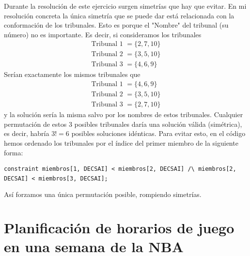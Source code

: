 \documentclass[11pt]{article}
\begin{document}
Durante la resolución de este ejercicio surgen simetrías que hay que evitar. En mi resolución concreta la única simetría que se puede dar está relacionada con la conformación de los tribunales. Esto es porque el "Nombre" del tribunal (su número) no es importante. Es decir, si consideramos los tribunales
\begin{gather*}
    \text{Tribunal 1 }=\{2, 7, 10\}\\
    \text{Tribunal 2 }=\{3, 5, 10\}\\
    \text{Tribunal 3 }=\{4, 6, 9\}
\end{gather*}
Serían exactamente los mismos tribunales que
\begin{gather*}
    \text{Tribunal 1 }=\{4, 6, 9\}\\
    \text{Tribunal 2 }=\{3, 5, 10\}\\
    \text{Tribunal 3 }=\{2, 7, 10\}
\end{gather*}
y la solución sería la misma salvo por los nombres de estos tribunales. Cualquier permutación de estos 3 posibles tribunales daría una solución válida (simétrica), es decir, habría $3!=6$ posibles soluciones idénticas. Para evitar esto, en el código hemos ordenado los tribunales por el índice del primer miembro de la siguiente forma:
\begin{lstlisting}[language=MiniZinc]
constraint miembros[1, DECSAI] < miembros[2, DECSAI] /\ miembros[2, DECSAI] < miembros[3, DECSAI];
\end{lstlisting}
Así forzamos una única permutación posible, rompiendo simetrías.

\section{Planificación de horarios de juego en una semana de la NBA}
\end{document}
